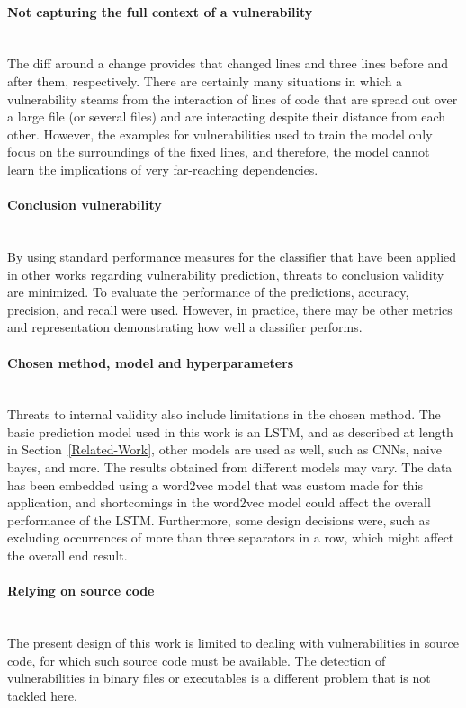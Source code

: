 \documentclass[
a4paper,
pagesize,
pdftex,
12pt,
twoside, %
BCOR=5mm, %
ngerman,
fleqn,
final,
]{scrartcl}
\begin{document}
	\paragraph{Not capturing the full context of a vulnerability}\mbox{}\\
	The diff around a change provides that changed lines and three lines before and after them, respectively. There are certainly many situations in which a vulnerability steams from the interaction of lines of code that are spread out over a large file (or several files) and are interacting despite their distance from each other. However, the examples for vulnerabilities used to train the model only focus on the surroundings of the fixed lines, and therefore, the model cannot learn the implications of very far-reaching dependencies.\\
	\paragraph{Conclusion vulnerability}\mbox{}\\
	By using standard performance measures for the classifier that have been applied in other works regarding vulnerability prediction, threats to conclusion validity are minimized. To evaluate the performance of the predictions, accuracy, precision, and recall were used. However, in practice, there may be other metrics and representation demonstrating how well a classifier performs.
	\paragraph{Chosen method, model and hyperparameters}\mbox{}\\
	Threats to internal validity also include limitations in the chosen method. The basic prediction model used in this work is an LSTM, and as described at length in Section~\ref{Related-Work}, other models are used as well, such as CNNs, naive bayes, and more. The results obtained from different models may vary. The data has been embedded using a word2vec model that was custom made for this application, and shortcomings in the word2vec model could affect the overall performance of the LSTM. Furthermore, some design decisions were, such as excluding occurrences of more than three separators in a row, which might affect the overall end result.  
	\paragraph{Relying on source code}\mbox{}\\
	The present design of this work is limited to dealing with vulnerabilities in source code, for which such source code must be available. The detection of vulnerabilities in binary files or executables is a different problem that is not tackled here. 
\end{document}
